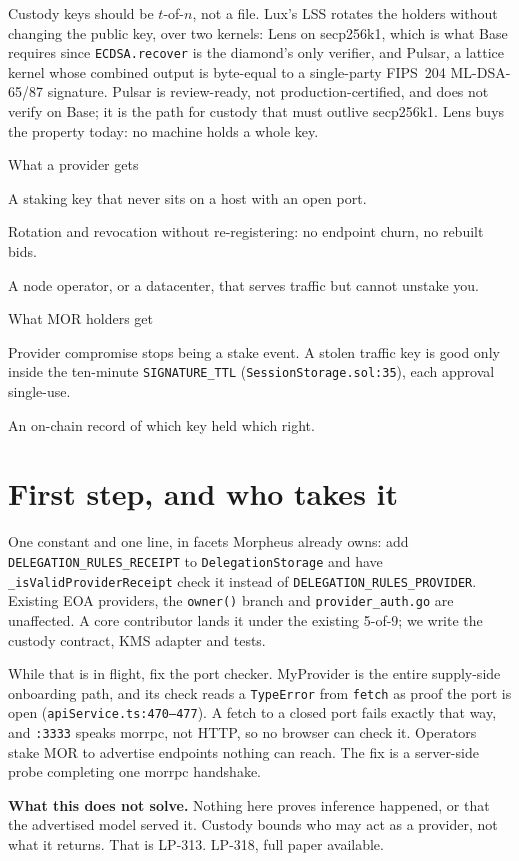 \documentclass[10pt,a4paper]{article}
\begin{document}
Custody keys should be $t$-of-$n$, not a file. Lux's LSS rotates the holders without changing the public key, over two kernels: Lens on secp256k1, which is what Base requires since \texttt{ECDSA.recover} is the diamond's only verifier, and Pulsar, a lattice kernel whose combined output is byte-equal to a single-party FIPS~204 ML-DSA-65/87 signature. Pulsar is review-ready, not production-certified, and does not verify on Base; it is the path for custody that must outlive secp256k1. Lens buys the property today: no machine holds a whole key.

\begin{stake}{What a provider gets}
\item A staking key that never sits on a host with an open port.
\item Rotation and revocation without re-registering: no endpoint churn, no rebuilt bids.
\item A node operator, or a datacenter, that serves traffic but cannot unstake you.
\end{stake}

\begin{stake}{What MOR holders get}
\item Provider compromise stops being a stake event. A stolen traffic key is good only inside the ten-minute \texttt{SIGNATURE\_TTL} (\texttt{SessionStorage.sol:35}), each approval single-use.
\item An on-chain record of which key held which right.
\end{stake}

\section*{First step, and who takes it}

One constant and one line, in facets Morpheus already owns: add \texttt{DELEGATION\_\allowbreak RULES\_\allowbreak RECEIPT} to \texttt{Delegation\allowbreak Storage} and have \texttt{\_isValid\allowbreak ProviderReceipt} check it instead of \texttt{DELEGATION\_\allowbreak RULES\_\allowbreak PROVIDER}. Existing EOA providers, the \texttt{owner()} branch and \texttt{provider\_auth.go} are unaffected. A core contributor lands it under the existing 5-of-9; we write the custody contract, KMS adapter and tests.

While that is in flight, fix the port checker. MyProvider is the entire supply-side onboarding path, and its check reads a \texttt{TypeError} from \texttt{fetch} as proof the port is open (\texttt{apiService.ts:470--477}). A fetch to a closed port fails exactly that way, and \texttt{:3333} speaks morrpc, not HTTP, so no browser can check it. Operators stake MOR to advertise endpoints nothing can reach. The fix is a server-side probe completing one morrpc handshake.

\vspace{0.5ex}
\noindent\textbf{What this does not solve.} Nothing here proves inference happened, or that the advertised model served it. Custody bounds who may act as a provider, not what it returns. That is LP-313. {\color{muted}\sffamily\footnotesize LP-318, full paper available.}
\end{document}
